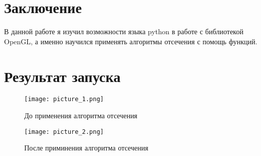 \documentclass[a4paper, 14pt]{extarticle}
\begin{document}
\section{Заключение}

    В данной работе я изучил возможности языка python в работе с библиотекой OpenGL, а именно научился применять алгоритмы отсечения с помощь функций.

\section{Результат запуска}
    
\begin{figure}[!htb]
	\centering
	\texttt{[image: picture\_1.png]}
\caption{До применения алгоритма отсечения}
\label{fig:picture_1.png}
\end{figure}

\begin{figure}[!htb]
	\centering
	\texttt{[image: picture\_2.png]}
\caption{После приминения алгоритма отсечения}
\label{fig:picture_2.png}
\end{figure}
\end{document}
